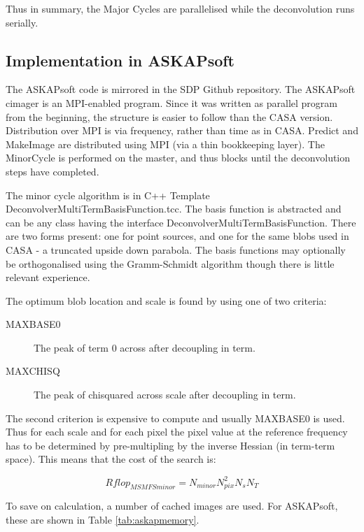 \documentclass[11pt,a4paper,variablewidth]{article}
\begin{document}
Thus in summary, the Major Cycles are parallelised while the deconvolution runs serially.

\subsection{Implementation in ASKAPsoft}

The ASKAPsoft code is mirrored in the SDP Github repository. The ASKAPsoft cimager is an MPI-enabled program. Since it was written as parallel program from the beginning, the structure is easier to follow than the CASA version. Distribution over MPI is via frequency, rather than time as in CASA. Predict and MakeImage are distributed using MPI (via a thin bookkeeping layer). The MinorCycle is performed on the master, and thus blocks until the deconvolution steps have completed.

The minor cycle  algorithm is in C++ Template DeconvolverMultiTermBasisFunction.tcc. The basis function is abstracted and can be any class having the interface DeconvolverMultiTermBasisFunction. There are two forms present: one for point sources, and one for the same blobs used in CASA - a truncated upside down parabola. The basis functions may optionally be orthogonalised using the Gramm-Schmidt algorithm though there is little relevant experience.

The optimum blob location and scale is found by using one of two criteria:

\begin{description}
\item[MAXBASE0] The peak of term 0 across after decoupling in term.
\item[MAXCHISQ] The peak of chisquared across scale after decoupling in term.
\end{description}

The second criterion is expensive to compute and usually MAXBASE0 is used. Thus for each scale and for each pixel the pixel value at the reference frequency has to be determined by pre-multipling by the inverse Hessian (in term-term space). This means that the cost of the search is:

\begin{equation}
Rflop_{MSMFSminor} = N_{minor} N_{pix}^2 N_s N_T	
\end{equation}


To save on calculation, a number of cached images are used. For ASKAPsoft, these are shown in Table \ref{tab:askapmemory}.
\end{document}
